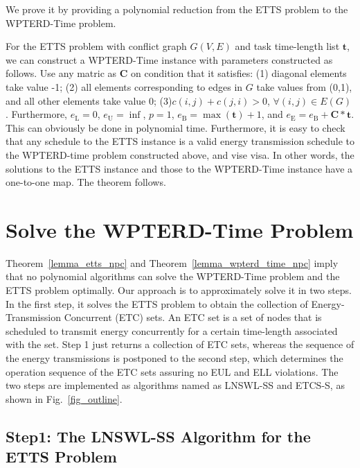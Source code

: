 \documentclass[journal,10pt]{IEEEtran}
\begin{document}
\begin{IEEEproof}
We prove it by providing a polynomial reduction from the ETTS problem to the WPTERD-Time problem.

For the ETTS problem with conflict graph $G(V,E)$ and task time-length list $\mathbf{t}$, we can construct a WPTERD-Time instance with parameters constructed as follows. Use any matric as $\mathbf{C}$ on condition that it satisfies: (1) diagonal elements take value -1; (2) all elements corresponding to edges in $G$ take values from (0,1), and all other elements take value 0; (3)$c(i,j){+}c(j,i){>}0$, ${\forall}(i,j){\in}E(G)$. Furthermore, $e_\text{L}{=}0$, $e_\text{U}{=}\inf$, $p{=}1$, $e_\text{B}{=}\max(\mathbf{t}){+}1$, and $e_\text{E}{=}e_\text{B}{+}\mathbf{C}{*}\mathbf{t}$. This can obviously be done in polynomial time. Furthermore, it is easy to check that any schedule to the ETTS instance is a valid energy transmission schedule to the WPTERD-time problem constructed above, and vise visa. In other words, the solutions to the ETTS instance and those to the WPTERD-Time instance have a one-to-one map. The theorem follows.
\end{IEEEproof}

\section{Solve the WPTERD-Time Problem}
\label{sec_solve_wpter_time}

Theorem~\ref{lemma_etts_npc} and Theorem~\ref{lemma_wpterd_time_npc} imply that no polynomial algorithms can solve the WPTERD-Time problem and the ETTS problem optimally. Our approach is to approximately solve it in two steps. In the first step, it solves the ETTS problem to obtain the collection of Energy-Transmission Concurrent (ETC) sets. An ETC set is a set of nodes that is scheduled to transmit energy concurrently for a certain time-length associated with the set. Step 1 just returns a collection of ETC sets, whereas the sequence of the energy transmissions is postponed to the second step, which determines the operation sequence of the ETC sets assuring no EUL and ELL violations. The two steps are implemented as algorithms named as LNSWL-SS and ETCS-S, as shown in Fig.~\ref{fig_outline}.

\subsection{Step1: The LNSWL-SS Algorithm for the ETTS Problem}
\end{document}
